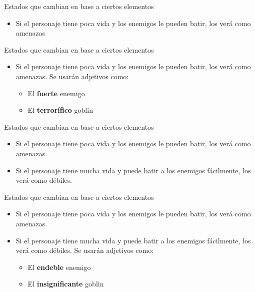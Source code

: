 \begin{tframe}{Estados que cambian en base a ciertos elementos}
	\begin{itemize}
		\item<+-| alert@+> Si el personaje tiene poca vida y los enemigos le pueden batir, los verá como amenazas
	\end{itemize}
\end{tframe}

\begin{tframe}{Estados que cambian en base a ciertos elementos}
	\begin{itemize}
		\item<+-| alert@+> Si el personaje tiene poca vida y los enemigos le pueden batir, los verá como amenazas. Se usarán adjetivos como:
		\begin{itemize}
			\item El \textbf{fuerte} enemigo
			\item El \textbf{terrorífico} goblin
		\end{itemize}
	\end{itemize}
\end{tframe}

\begin{tframe}{Estados que cambian en base a ciertos elementos}
	\begin{itemize}
		\item Si el personaje tiene poca vida y los enemigos le pueden batir, los verá como amenazas.
		\item<+-| alert@+> Si el personaje tiene mucha vida y puede batir a los enemigos fácilmente, los verá como débiles.
	\end{itemize}
\end{tframe}

\begin{tframe}{Estados que cambian en base a ciertos elementos}
	\begin{itemize}
		\item Si el personaje tiene poca vida y los enemigos le pueden batir, los verá como amenazas.
		\item<+-| alert@+> Si el personaje tiene mucha vida y puede batir a los enemigos fácilmente, los verá como débiles. Se usarán adjetivos como:		
		\begin{itemize}
			\item El \textbf{endeble} enemigo
			\item El \textbf{insignificante} goblin
		\end{itemize}
	\end{itemize}
\end{tframe}

